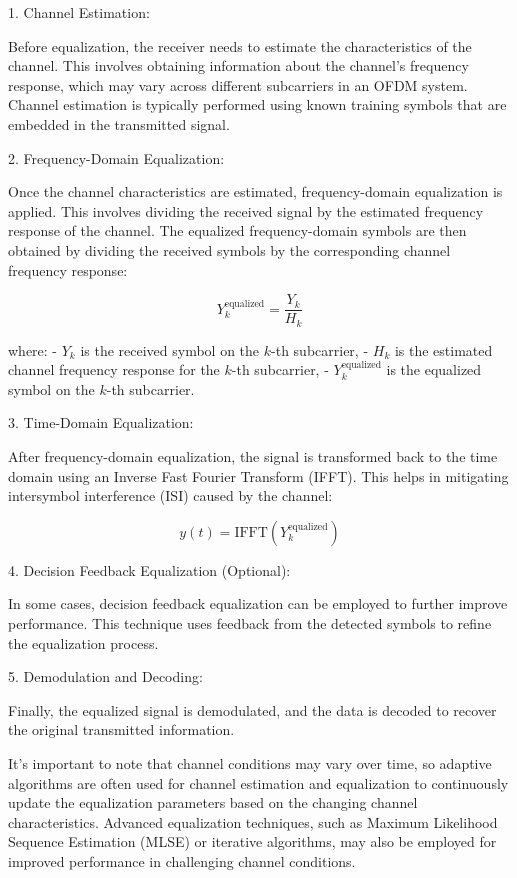 \documentclass[colorlinks,11pt,a4paper,normalphoto,withhyper,ragged2e]{altareport}
\begin{document}
				1. Channel Estimation:
				
				Before equalization, the receiver needs to estimate the characteristics of the channel. This involves obtaining information about the channel's frequency response, which may vary across different subcarriers in an OFDM system. Channel estimation is typically performed using known training symbols that are embedded in the transmitted signal.
				
				2. Frequency-Domain Equalization:
				
				Once the channel characteristics are estimated, frequency-domain equalization is applied. This involves dividing the received signal by the estimated frequency response of the channel. The equalized frequency-domain symbols are then obtained by dividing the received symbols by the corresponding channel frequency response:
				
				\[ Y_k^{\text{equalized}} = \frac{Y_k}{H_k} \]
				
				where:
				- \( Y_k \) is the received symbol on the \(k\)-th subcarrier,
				- \( H_k \) is the estimated channel frequency response for the \(k\)-th subcarrier,
				- \( Y_k^{\text{equalized}} \) is the equalized symbol on the \(k\)-th subcarrier.
				
				3. Time-Domain Equalization:
				
				After frequency-domain equalization, the signal is transformed back to the time domain using an Inverse Fast Fourier Transform (IFFT). This helps in mitigating intersymbol interference (ISI) caused by the channel:
				
				\[ y(t) = \text{IFFT}(Y_k^{\text{equalized}}) \]
				
				4. Decision Feedback Equalization (Optional):
				
				In some cases, decision feedback equalization can be employed to further improve performance. This technique uses feedback from the detected symbols to refine the equalization process.
				
				5. Demodulation and Decoding:
				
				Finally, the equalized signal is demodulated, and the data is decoded to recover the original transmitted information.
				
				It's important to note that channel conditions may vary over time, so adaptive algorithms are often used for channel estimation and equalization to continuously update the equalization parameters based on the changing channel characteristics. Advanced equalization techniques, such as Maximum Likelihood Sequence Estimation (MLSE) or iterative algorithms, may also be employed for improved performance in challenging channel conditions.
				
\end{document}
